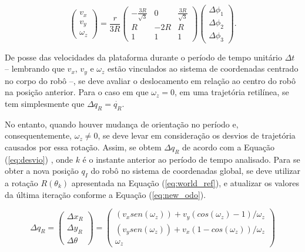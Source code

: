 \begin{equation}
  \begin{pmatrix}
    v_x \\
    v_y \\
    \omega_z
  \end{pmatrix}
  =
  \frac{r}{3R}
  \begin{pmatrix}
    -\frac{3R}{\sqrt{3}} & 0   & \frac{3R}{\sqrt{3}} \\
    R                    & -2R & R                   \\
    1                    & 1   & 1
  \end{pmatrix}
  \begin{pmatrix}
    \Delta{\phi_1} \\
    \Delta{\phi_2} \\
    \Delta{\phi_3}
  \end{pmatrix}.
  \label{eq:odo}
\end{equation}

De posse das velocidades da plataforma durante o período de tempo unitário $\Delta t$ -- lembrando que $v_x$, $v_y$ e $\omega_z$ estão vinculados ao sistema de coordenadas centrado no corpo do robô --, se deve avaliar o deslocamento em relação ao centro do robô na posição anterior. Para o caso em que $\omega_z = 0$, em uma trajetória retilínea, se tem simplesmente que $\Delta q_R = \dot{q_R}$.

No entanto, quando houver mudança de orientação no período e, consequentemente, $\omega_z \neq 0$, se deve levar em consideração os desvios de trajetória causados por essa rotação. Assim, se obtem $\Delta q_R$ de acordo com a Equação (\ref{eq:desvio}) \citep{lynch2017modern}, onde $k$ é o instante anterior ao período de tempo analisado. Para se obter a nova posição $q_I$ do robô no sistema de coordenadas global, se deve utilizar a rotação $R(\theta_k)$ apresentada na Equação (\ref{eq:world_ref}), e atualizar os valores da última iteração conforme a Equação (\ref{eq:new_odo}).

\begin{equation}
  \Delta q_R
  =
  \begin{pmatrix}
    \Delta x_R \\
    \Delta y_R \\
    \Delta\theta
  \end{pmatrix}
  =
  \begin{pmatrix}
    (v_x sen(\omega_z)) + v_y (cos(\omega_z) - 1)/\omega_z \\
    (v_y sen(\omega_z)) + v_x (1-cos(\omega_z)) / \omega_z \\
    \omega_z
  \end{pmatrix}
  \label{eq:desvio}
\end{equation}


